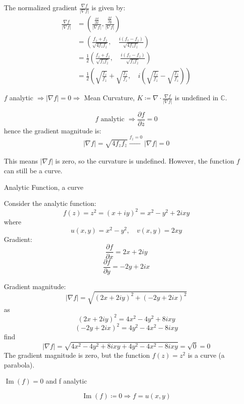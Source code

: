 The normalized gradient $\frac{\nabla f}{|\nabla f|}$ is given by:
\[ 
\begin{split}
\frac{\nabla f}{|\nabla f|} &= \left( \frac{\frac{\partial f}{\partial x}}{|\nabla f|}, \frac{\frac{\partial f}{\partial y}}{|\nabla f|} \right) \\
&= \left( \frac{f_z + f_{\overline{z}}}{\sqrt{4 f_z f_{\overline{z}}}}, \quad \frac{i (f_z - f_{\overline{z}})}{\sqrt{4 f_z f_{\overline{z}}}} \right) \\
&= \frac{1}{2} \left( \frac{f_z + f_{\overline{z}}}{\sqrt{f_z f_{\overline{z}}}}, \quad \frac{i (f_z - f_{\overline{z}})}{\sqrt{f_z f_{\overline{z}}}} \right) \\
&= \frac{1}{2} \left( \sqrt{\frac{f_z}{f_{\overline{z}}}} + \sqrt{\frac{f_{\overline{z}}}{f_z}}, \quad i \left( \sqrt{\frac{f_z}{f_{\overline{z}}}} - \sqrt{\frac{f_{\overline{z}}}{f_z}} \right) \right)
\end{split}
\]

\begin{prop}
$f$ analytic $\Longrightarrow |\nabla f|=0\Longrightarrow$ Mean Curvature, $K\coloneqq \nabla\cdot\frac{\nabla f}{|\nabla f|}$ is undefined in $\mathbb{C}$.    
\end{prop}
\[f\text{ analytic }\Longrightarrow \frac{\partial f}{\partial \overline{z}} = 0\]
hence the gradient magnitude is:
\[ |\nabla f| = \sqrt{4 f_z f_{\overline{z}}} \xrightarrow[]{f_{\overline{z}} = 0}|\nabla f| = 0\]

This means \(|\nabla f|\) is zero, so the curvature is undefined. However, the function \( f \) can still be a curve.

\begin{eg}{Analytic Function, a curve}
\end{eg}
Consider the analytic function:
   \[ f(z) = z^2 = (x + iy)^2 = x^2 - y^2 + 2ixy \]
where
    \[ u(x, y) = x^2 - y^2, \quad v(x, y) = 2xy \]
Gradient:
   \[ \frac{\partial f}{\partial x} = 2x + 2iy \]
   \[ \frac{\partial f}{\partial y} = -2y + 2ix \]

Gradient magnitude:
   \[ |\nabla f| = \sqrt{\left( 2x + 2iy \right)^2 + \left( -2y + 2ix \right)^2} \]
as
   \[ \left( 2x + 2iy \right)^2 = 4x^2 - 4y^2 + 8ixy \]
   \[ \left( -2y + 2ix \right)^2 = 4y^2 - 4x^2 - 8ixy \]
find
   \[ |\nabla f| = \sqrt{4x^2 - 4y^2 + 8ixy + 4y^2 - 4x^2 - 8ixy} = \sqrt{0} = 0 \]
The gradient magnitude is zero, but the function \( f(z) = z^2 \) is a curve (a parabola).

\begin{prop}
    $\operatorname{Im}(f)=0$ and f analytic
\end{prop}
\[ \operatorname{Im}(f) \coloneqq 0 \Longrightarrow f = u(x, y) \]


